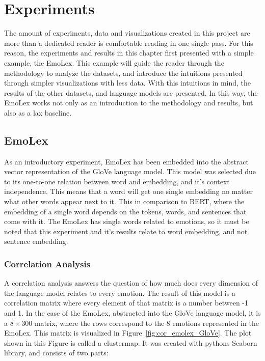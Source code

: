 \chapter{Experiments}\label{chap:Experiments}
The amount of experiments, data and visualizations created in this project are more than a dedicated reader is comfortable reading in one single pass. For this reason, the experiments and results in this chapter first presented with a simple example, the EmoLex. This example will guide the reader through the methodology to analyze the datasets, and introduce the intuitions presented through simpler visualizations with less data. With this intuitions in mind, the results of the other datasets, and language models are presented. In this way, the EmoLex works not only as an introduction to the methodology and results, but also as a lax baseline.

\section{EmoLex}\label{sec:EmoLex_Results}
As an introductory experiment, EmoLex has been embedded into the abstract vector representation of the GloVe language model. This model was selected due to its one-to-one relation between word and embedding, and it's context independence. This means that a word will get one single embedding no matter what other words appear next to it. This in comparison to BERT, where the embedding of a single word depends on the tokens, words, and sentences that come with it. The EmoLex has single words related to emotions, so it must be noted that this experiment and it's results relate to word embedding, and not sentence embedding.

\subsection{Correlation Analysis}
A correlation analysis answers the question of how much does every dimension of the language model relates to every emotion. The result of this model is a correlation matrix where every element of that matrix is a number between -1 and 1.
In the case of the EmoLex, abstracted into the GloVe language model, it is a $8 \times 300$ matrix, where the rows correspond to the 8 emotions represented in the EmoLex. This matrix is visualized in Figure~\ref{fig:cor_emolex_GloVe}. The plot shown in this Figure is called a clustermap. It was created with pythons Seaborn library, and consists of two parts:

